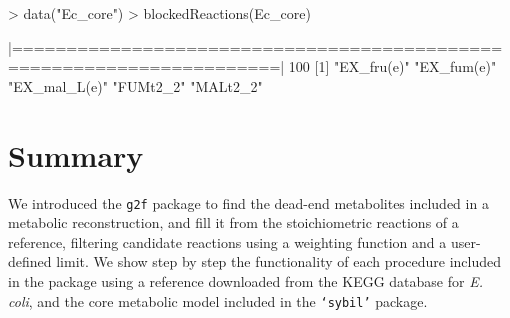 \begin{Schunk}
\begin{Sinput}
> data("Ec_core")
> blockedReactions(Ec_core)
\end{Sinput}
\begin{Soutput}
  |======================================================================| 100%
[1] "EX_fru(e)"   "EX_fum(e)"   "EX_mal_L(e)" "FUMt2_2"     "MALt2_2"   
\end{Soutput}
\end{Schunk}
\section{Summary}
We introduced the \texttt{g2f} package to find the dead-end metabolites included in a metabolic reconstruction, and fill it from the stoichiometric reactions of a reference, filtering candidate reactions using a weighting function and a user-defined limit. We show step by step the functionality of each procedure included in the package using a reference downloaded from the KEGG database for \emph{E. coli}, and the core metabolic model included in the \texttt{`sybil'} package.
